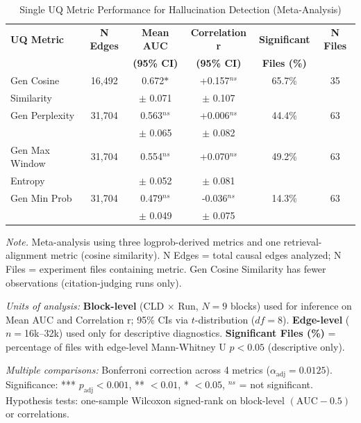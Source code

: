 \begin{table}[H]
\centering
\begin{threeparttable}
\caption{Single UQ Metric Performance for Hallucination Detection (Meta-Analysis)}
\label{tab:rq2_single_metrics}
\small
\setlength{\tabcolsep}{4pt}
\begin{tabular}{lccccc}
\toprule
\textbf{UQ Metric} & \textbf{N Edges} & \textbf{Mean AUC} & \textbf{Correlation r} & \textbf{Significant} & \textbf{N Files} \\
 & & \textbf{(95\% CI)} & \textbf{(95\% CI)} & \textbf{Files (\%)} & \\
\midrule
Gen Cosine & 16,492 & 0.672$*$ & +0.157$^{ns}$ & 65.7\% & 35 \\
Similarity & & $\pm$ 0.071 & $\pm$ 0.107 & & \\
\midrule
Gen Perplexity & 31,704 & 0.563$^{ns}$ & +0.006$^{ns}$ & 44.4\% & 63 \\
 & & $\pm$ 0.065 & $\pm$ 0.082 & & \\
\midrule
Gen Max Window & 31,704 & 0.554$^{ns}$ & +0.070$^{ns}$ & 49.2\% & 63 \\
Entropy & & $\pm$ 0.052 & $\pm$ 0.081 & & \\
\midrule
Gen Min Prob & 31,704 & 0.479$^{ns}$ & -0.036$^{ns}$ & 14.3\% & 63 \\
 & & $\pm$ 0.049 & $\pm$ 0.075 & & \\
\bottomrule
\end{tabular}
\begin{tablenotes}
\small
\item \textit{Note.} Meta-analysis using three logprob-derived metrics and one retrieval-alignment metric (cosine similarity). N Edges = total causal edges analyzed; N Files = experiment files containing metric. Gen Cosine Similarity has fewer observations (citation-judging runs only).
\item \textit{Units of analysis:} \textbf{Block-level} (CLD $\times$ Run, $N=9$ blocks) used for inference on Mean AUC and Correlation r; 95\% CIs via $t$-distribution ($df=8$). \textbf{Edge-level} ($n=$16k--32k) used only for descriptive diagnostics. \textbf{Significant Files (\%)} = percentage of files with edge-level Mann-Whitney U $p<0.05$ (descriptive only).
\item \textit{Multiple comparisons:} Bonferroni correction across 4 metrics ($\alpha_{\text{adj}} = 0.0125$). Significance: *** $p_{\text{adj}}<0.001$, ** $<0.01$, * $<0.05$, $^{ns}$ = not significant. Hypothesis tests: one-sample Wilcoxon signed-rank on block-level $(\mathrm{AUC}-0.5)$ or correlations.
\end{tablenotes}
\end{threeparttable}
\end{table}
